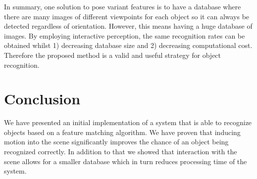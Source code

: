 In summary, one solution to pose variant features is to have a database where there are many images of different viewpoints for each object so it can always be detected regardless of orientation.  However, this means having a huge database of images.  By employing interactive perception, the same recognition rates can be obtained whilst 1) decreasing database size and 2) decreasing computational cost.  Therefore the proposed method is a valid and useful strategy for object recognition.






\section{Conclusion}
We have presented an initial implementation of a system that is able to recognize objects based on a feature matching algorithm. We have proven that inducing motion into the scene significantly improves the chance of an object being recognized correctly. In addition to that we showed that interaction with the scene allows for a smaller database which in turn reduces processing time of the system.
